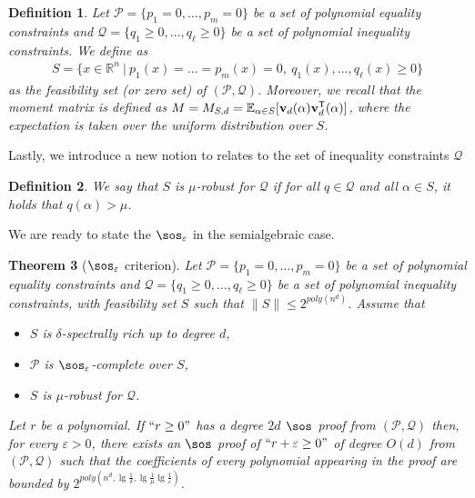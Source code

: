 \documentclass[11pt]{article}
\newtheorem{theorem}{Theorem}[section]
\newtheorem{definition}[theorem]{Definition}
\begin{document}
\begin{definition}
    Let $\mathcal{P} = \{p_1=0,\ldots,p_m=0\}$ be a set of polynomial equality constraints and $\mathcal{Q} = \{q_1 \geq 0, \ldots, q_\ell \geq 0\}$ be a set of polynomial inequality constraints. We define as
    \begin{align*}
        S = \{x \in \mathbb{R}^n \ | \ p_1(x) = \ldots = p_m(x) =0, \ q_1(x), \ldots, q_\ell(x) \geq 0\}
    \end{align*}
    as the \emph{feasibility set} (or \emph{zero set}) of $(\mathcal{P}, \mathcal{Q})$. Moreover, we recall that the moment matrix is defined as $M = M_{S,d} = \mathbb{E}_{\alpha \in S}[\mathbf{v}_d(\alpha) \mathbf{v}_d^{\sf{T}}(\alpha)]$, where the expectation is taken over the uniform distribution over $S$.
\end{definition}

Lastly, we introduce a new notion to relates to the set of inequality constraints $\mathcal{Q}$

\begin{definition}
    We say that $S$ is $\mu$-robust for $\mathcal{Q}$ if for all $q \in \mathcal{Q}$ and all $\alpha \in S$, it holds that $q(\alpha) > \mu$. 
\end{definition}

We are ready to state the $\sos_{\varepsilon}$ in the semialgebraic case.

\begin{theorem}[$\sos_{\varepsilon}$ criterion]\label{th:SoS_Criterion_semialgebraic}
    Let $\mathcal{P} = \{p_1=0,\ldots,p_m=0\}$ be a set of polynomial equality constraints and $\mathcal{Q} = \{q_1 \geq 0, \ldots, q_\ell \geq 0\}$ be a set of polynomial inequality constraints, with feasibility set $S$ such that $\| S \| \leq 2^{poly(n^d)}$.
    Assume that
    \begin{itemize}
        \item [1)] $S$ is $\delta$-spectrally rich up to degree $d$, 
        \item [2)] $\mathcal{P}$ is $\sos_\varepsilon$-complete over $S$,
        \item [3)] $S$ is $\mu$-robust for $\mathcal{Q}$.
    \end{itemize}
    Let $r$ be a polynomial. If $``r \geq 0"$ has a degree $2d$ $\sos$ proof from $(\mathcal{P}, \mathcal{Q})$
    then, for every $\varepsilon>0$, there exists an $\sos$ proof of $``r+\varepsilon \geq 0"$ of degree $O(d)$ from $(\mathcal{P}, \mathcal{Q})$
    such that the coefficients of every polynomial appearing in the proof are bounded by $2^{poly(n^d, \lg \frac{1}{\delta}, \lg \frac{1}{\mu} \lg \frac{1}{\varepsilon})}$.
\end{theorem}
\end{document}

